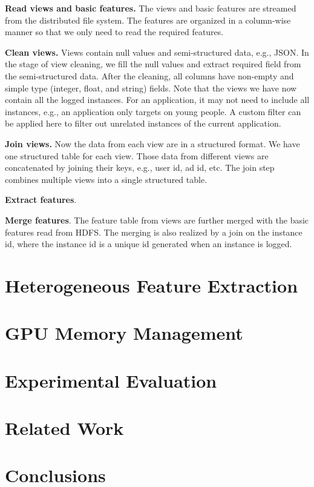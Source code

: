 \documentclass[conference]{IEEEtran}
\begin{document}
\textbf{Read views and basic features.} 
The views and basic features are streamed from the distributed file system. The features are organized in a column-wise manner so that we only need to read the required features. 

\textbf{Clean views.} 
Views contain null values and semi-structured data, e.g., JSON. In the stage of view cleaning, we fill the null values and extract required field from the semi-structured data. After the cleaning, all columns have non-empty and simple type (integer, float, and string) fields. Note that the views we have now contain all the logged instances. For an application, it may not need to include all instances, e.g., an application only targets on young people. A custom filter can be applied here to filter out unrelated instances of the current application.

\textbf{Join views.} 
Now the data from each view are in a structured format. We have one structured table for each view. Those data from different views are concatenated by joining their keys, e.g., user id, ad id, etc. The join step combines multiple views into a single structured table.

\textbf{Extract features}. 
 

\textbf{Merge features}. 
The feature table from views are further merged with the basic features read from HDFS. The merging is also realized by a join on the instance id, where the instance id is a unique id generated when an instance is logged. 

\section{Heterogeneous Feature Extraction}

\section{GPU Memory Management}

\section{Experimental Evaluation}

\section{Related Work}

\section{Conclusions}



%
\end{document}
